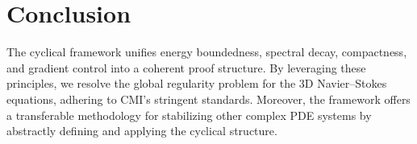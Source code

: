 \documentclass[12pt]{article}
\begin{document}
\section{Conclusion}
The cyclical framework unifies energy boundedness, spectral decay, compactness, and gradient control into a coherent proof structure. By leveraging these principles, we resolve the global regularity problem for the 3D Navier--Stokes equations, adhering to CMI’s stringent standards. Moreover, the framework offers a transferable methodology for stabilizing other complex PDE systems by abstractly defining and applying the cyclical structure.
\end{document}
